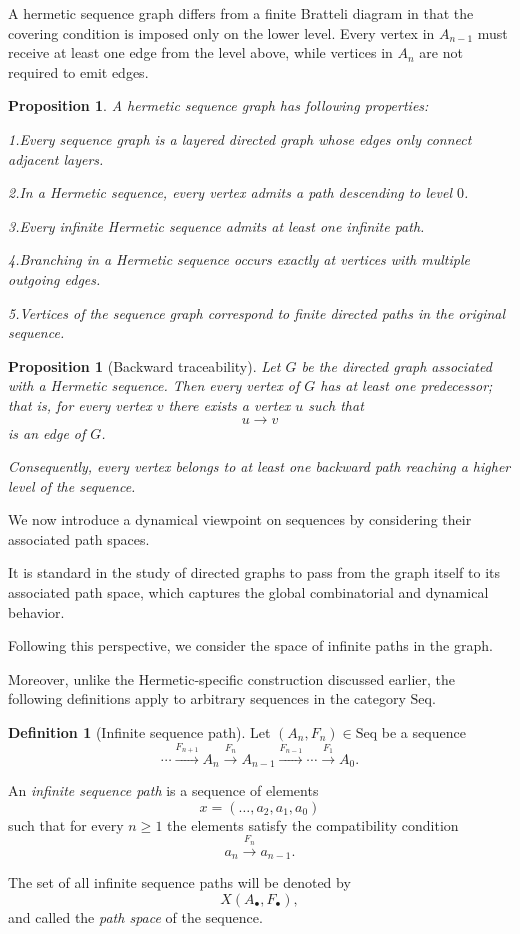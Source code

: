 \documentclass[11pt]{book}
\theoremstyle{definition}
\newtheorem{definition}{Definition}[section]
\theoremstyle{plain}
\newtheorem{proposition}[theorem]{Proposition}
\theoremstyle{remark}
\begin{document}
A hermetic sequence graph differs from a finite Bratteli diagram in that the covering condition is imposed
only on the lower level. Every vertex in $A_{n-1}$ must receive at least one edge from the level above, 
while vertices in $A_n$ are not required to emit edges. 

\begin{proposition}
A hermetic sequence graph has following 
properties:

1.Every sequence graph is a layered directed graph whose
edges only connect adjacent layers.

2.In a Hermetic sequence, every vertex admits
a path descending to level $0$.

3.Every infinite Hermetic sequence admits at least one infinite path.

4.Branching in a Hermetic sequence occurs exactly
at vertices with multiple outgoing edges.

5.Vertices of the sequence graph correspond to
finite directed paths in the original sequence.
\end{proposition}

\begin{proposition}[Backward traceability]
Let $G$ be the directed graph associated with a Hermetic sequence.
Then every vertex of $G$ has at least one predecessor; that is,
for every vertex $v$ there exists a vertex $u$ such that
\[
u \to v
\]
is an edge of $G$.

Consequently, every vertex belongs to at least one backward path
reaching a higher level of the sequence.
\end{proposition}

We now introduce a dynamical viewpoint on sequences by considering
their associated path spaces.  

It is standard in the study of directed graphs
to pass from the graph itself to its associated path space,
which captures the global combinatorial and dynamical behavior.

Following this perspective,
we consider the space of infinite paths in the graph.

Moreover, unlike the Hermetic-specific construction discussed earlier, 
the following definitions apply to arbitrary sequences in the category $\mathrm{Seq}$.

\begin{definition}[Infinite sequence path]
Let $(A_n,F_n) \in \mathrm{Seq}$ be a sequence
\[
\cdots \xrightarrow{F_{n+1}} A_n \xrightarrow{F_n} A_{n-1}
\xrightarrow{F_{n-1}} \cdots \xrightarrow{F_1} A_0 .
\]

An \emph{infinite sequence path} is a sequence of elements
\[
x = (\ldots, a_2, a_1, a_0)
\]
such that for every $n \ge 1$ the elements satisfy the compatibility
condition
\[
a_n \xrightarrow{F_n} a_{n-1}.
\]

The set of all infinite sequence paths will be denoted by
\[
X(A_\bullet,F_\bullet),
\]
and called the \emph{path space} of the sequence.
\end{definition}
\end{document}
